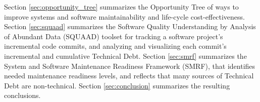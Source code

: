 Section \ref{sec:opportunity_tree} summarizes the Opportunity Tree of ways to improve systems and software maintainability and life-cycle cost-effectiveness. 
Section \ref{sec:squaad} summarizes the Software Quality Understanding by Analysis of Abundant Data (SQUAAD) toolset for tracking a software project's incremental code commits, and analyzing and visualizing each commit's incremental and cumulative Technical Debt.
Section \ref{sec:smrf} summarizes the System and Software Maintenance Readiness Framework (SMRF), that identifies needed maintenance readiness levels, and reflects that many sources of Technical Debt are non-technical.
Section \ref{sec:conclusion} summarizes the resulting conclusions.